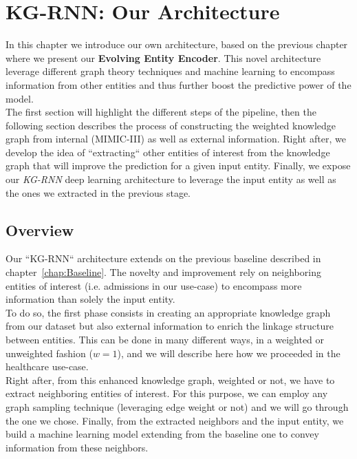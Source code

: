 \chapter{KG-RNN: Our Architecture}
\label{chap:KG-RNN}
In this chapter we introduce our own architecture, based on the previous chapter where we present our \textbf{Evolving Entity Encoder}. This novel architecture leverage different graph theory techniques and machine learning to encompass information from other entities and thus further boost the predictive power of the model. \\

The first section will highlight the different steps of the pipeline, then the following section describes the process of constructing the weighted knowledge graph from internal (MIMIC-III) as well as external information. Right after, we develop the idea of ``extracting`` other entities of interest from the knowledge graph that will improve the prediction for a given input entity. Finally, we expose our \emph{KG-RNN} deep learning architecture to leverage the input entity as well as the ones we extracted in the previous stage.

\section{Overview}
Our ``KG-RNN`` architecture extends on the previous baseline described in chapter~\ref{chap:Baseline}. The novelty and improvement rely on neighboring entities of interest (i.e. admissions in our use-case) to encompass more information than solely the input entity. \\

To do so, the first phase consists in creating an appropriate knowledge graph from our dataset but also external information to enrich the linkage structure between entities. This can be done in many different ways, in a weighted or unweighted fashion ($w=1$), and we will describe here how we proceeded in the healthcare use-case. \\

Right after, from this enhanced knowledge graph, weighted or not, we have to extract neighboring entities of interest. For this purpose, we can employ any graph sampling technique (leveraging edge weight or not) and we will go through the one we chose. Finally, from the extracted neighbors and the input entity, we build a machine learning model extending from the baseline one to convey information from these neighbors.


